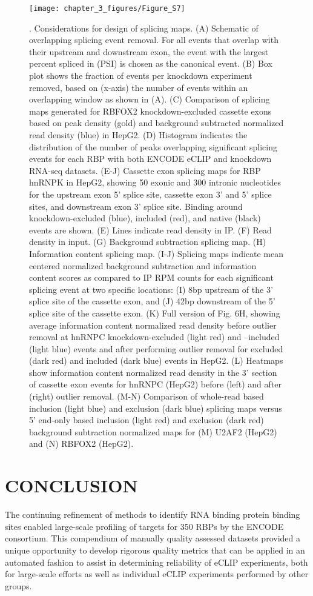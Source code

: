 \begin{figure}[ht]
  \centering
  \texttt{[image: chapter\_3\_figures/Figure\_S7]}
  \caption[Supplementary Figure 6]{. Considerations for design of splicing maps. (A) Schematic of overlapping splicing event removal. For all events that overlap with their upstream and downstream exon, the event with the largest percent spliced in (PSI) is chosen as the canonical event. (B) Box plot shows the fraction of events per knockdown experiment removed, based on (x-axis) the number of events within an overlapping window as shown in (A). (C) Comparison of splicing maps generated for RBFOX2 knockdown-excluded cassette exons based on peak density (gold) and background subtracted normalized read density (blue) in HepG2. (D) Histogram indicates the distribution of the number of peaks overlapping significant splicing events for each RBP with both ENCODE eCLIP and knockdown RNA-seq datasets. (E-J) Cassette exon splicing maps for RBP hnRNPK in HepG2, showing 50 exonic and 300 intronic nucleotides for the upstream exon 5’ splice site, cassette exon 3’ and 5’ splice sites, and downstream exon 3’ splice site. Binding around knockdown-excluded (blue), included (red), and native (black) events are shown. (E) Lines indicate read density in IP. (F) Read density in input. (G) Background subtraction splicing map. (H) Information content splicing map. (I-J) Splicing maps indicate mean centered normalized background subtraction and information content scores as compared to IP RPM counts for each significant splicing event at two specific locations: (I) 8bp upstream of the 3’ splice site of the cassette exon, and (J) 42bp downstream of the 5’ splice site of the cassette exon. (K) Full version of Fig. 6H, showing average information content normalized read density before outlier removal at hnRNPC knockdown-excluded (light red) and –included (light blue) events and after performing outlier removal for excluded (dark red) and included (dark blue) events in HepG2. (L) Heatmaps show information content normalized read density in the 3’ section of cassette exon events for hnRNPC (HepG2) before (left) and after (right) outlier removal. (M-N) Comparison of whole-read based inclusion (light blue) and exclusion (dark blue) splicing maps versus 5’ end-only based inclusion (light red) and exclusion (dark red) background subtraction normalized maps for (M) U2AF2 (HepG2) and (N) RBFOX2 (HepG2).}
  \label{fig:Figure_S6}
\end{figure}

\section{CONCLUSION}
The continuing refinement of methods to identify RNA binding protein binding sites enabled large-scale profiling of targets for 350 RBPs by the ENCODE consortium. This compendium of manually quality assessed datasets provided a unique opportunity to develop rigorous quality metrics that can be applied in an automated fashion to assist in determining reliability of eCLIP experiments, both for large-scale efforts as well as individual eCLIP experiments performed by other groups.

